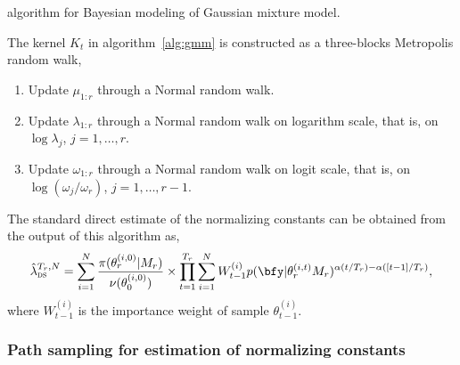 \documentclass[11pt, bib, hyper, mint, minted=cache]{marticle}
\begin{document}
\begin{algorithm}[t]
\caption{\smc algorithm for Bayesian modeling of Gaussian mixture
  model.}
\label{alg:gmm}
\end{algorithm}

The \mcmc kernel $K_t$ in algorithm~\ref{alg:gmm} is constructed as a
three-blocks Metropolis random walk,
\begin{enumerate}
  \item Update $\mu_{1:r}$ through a Normal random walk.
  \item Update $\lambda_{1:r}$ through a Normal random walk on logarithm
    scale, that is, on $\log\lambda_{j}$, $j = 1, \dots, r$.
  \item Update $\omega_{1:r}$ through a Normal random walk on logit scale,
    that is, on $\log(\omega_{j}/\omega_r)$, $j = 1,\dots,r-1$.
\end{enumerate}

The standard direct estimate of the normalizing constants
\textcite{DelMoral:2006hc} can be obtained from the output of this \smc
algorithm as,
\begin{equation}
  \hat\lambda_{\text{\textsc{ds}}}^{T_r,N} =
  \sum_{i=1}^N \frac{\pi(\theta_r^{(i,0)}|M_r)}{\nu(\theta_0^{(i,0)})} \times
  \prod_{t=1}^{T_r} \sum_{i=1}^N W_{t-1}^{(i)}
  p(\bfy|\theta_r^{(i,t)}M_r)^{\alpha(t/T_r) - \alpha([t-1]/T_r)},
  \label{eq:smc-ds}
\end{equation}
where $W_{t-1}^{(i)}$ is the importance weight of sample $\theta_{t-1}^{(i)}$.

\subsubsection{Path sampling for estimation of normalizing constants}
\end{document}
